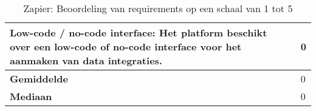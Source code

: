 \begin{landscape}
\begin{table}[H]
{\begin{tabular}{|ll|}
\multicolumn{1}{|l|}{Low-code / no-code interface: Het platform beschikt over een low-code of no-code interface voor het aanmaken van data integraties.}                                                                   & 0                            \\ \hline
\multicolumn{1}{|l|}{\textbf{Gemiddelde}}                                                                                                                                                                                  & 0                            \\ \hline
\multicolumn{1}{|l|}{\textbf{Mediaan}}                                                                                                                                                                                     & 0                            \\ \hline
\end{tabular}
}
\caption{Zapier: Beoordeling van requirements op een schaal van 1 tot 5}
\end{table}

\end{landscape}